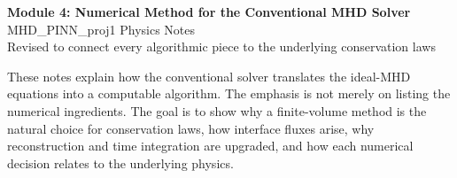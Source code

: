 \documentclass[11pt]{article}
\begin{document}
\begin{center}
    {\LARGE\bfseries Module 4: Numerical Method for the Conventional MHD Solver}\\[0.6em]
    {\large MHD\_PINN\_proj1 Physics Notes}\\[0.4em]
    {\normalsize Revised to connect every algorithmic piece to the underlying conservation laws}
\end{center}

\vspace{0.8em}

\begin{overviewbox}
These notes explain how the conventional solver translates the ideal-MHD equations into a computable algorithm.
The emphasis is not merely on listing the numerical ingredients. The goal is to show why a finite-volume method is the natural choice for conservation laws, how interface fluxes arise, why reconstruction and time integration are upgraded, and how each numerical decision relates to the underlying physics.
\end{overviewbox}
\end{document}
